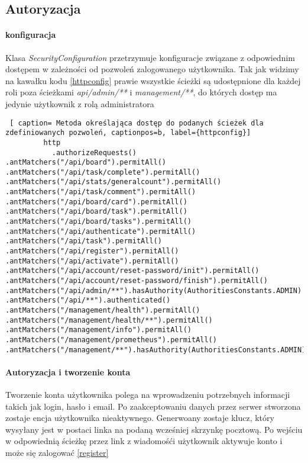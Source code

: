 \subsection{Autoryzacja}
\paragraph{konfiguracja}
Klasa \textit{SecurityConfiguration} przetrzymuje konfiguracje związane z odpowiednim dostępem w zależności od pozwoleń zalogowanego użytkownika. Tak jak widzimy na kawałku kodu \ref{httpconfig} prawie wszystkie ścieżki są udostępnione dla każdej roli poza ścieżkami \textit{api/admin/**} i \textit{management/**}, do których dostęp ma jedynie użytkownik z rolą administratora
\begin{lstlisting} [ caption= Metoda określająca dostęp do podanych ścieżek dla zdefiniowanych pozwoleń, captionpos=b, label={httpconfig}]
         http
           .authorizeRequests()
.antMatchers("/api/board").permitAll()
.antMatchers("/api/task/complete").permitAll()
.antMatchers("/api/stats/generalcount").permitAll()
.antMatchers("/api/task/comment").permitAll()
.antMatchers("/api/board/card").permitAll()
.antMatchers("/api/board/task").permitAll()
.antMatchers("/api/board/tasks").permitAll()
.antMatchers("/api/authenticate").permitAll()
.antMatchers("/api/task").permitAll()
.antMatchers("/api/register").permitAll()
.antMatchers("/api/activate").permitAll()
.antMatchers("/api/account/reset-password/init").permitAll()
.antMatchers("/api/account/reset-password/finish").permitAll()
.antMatchers("/api/admin/**").hasAuthority(AuthoritiesConstants.ADMIN)
.antMatchers("/api/**").authenticated()
.antMatchers("/management/health").permitAll()
.antMatchers("/management/health/**").permitAll()
.antMatchers("/management/info").permitAll()
.antMatchers("/management/prometheus").permitAll()
.antMatchers("/management/**").hasAuthority(AuthoritiesConstants.ADMIN);
\end{lstlisting}
\paragraph{Autoryzacja i tworzenie konta}
Tworzenie konta użytkownika polega na wprowadzeniu potrzebnych informacji takich jak login, hasło i email. Po zaakceptowaniu danych przez serwer stworzona zostaje encja użytkownika nieaktywnego. Generwoany zostaje klucz, który wysyłany jest w postaci linka na podaną wcześniej skrzynkę pocztową. Po wejściu w odpowiednią ścieżkę przez link z wiadomośći użytkownik aktywuje konto i może się zalogować \ref{register}

